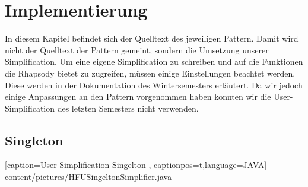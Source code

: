 \chapter{Implementierung}

In diesem Kapitel befindet sich der Quelltext des jeweiligen Pattern. Damit wird
nicht der Quelltext der Pattern gemeint, sondern die Umsetzung unserer
Simplification. Um eine eigene Simplification zu schreiben und auf die
Funktionen die Rhapsody bietet zu zugreifen, müssen einige Einstellungen
beachtet werden. Diese werden in der Dokumentation des Wintersemesters
erläutert. Da wir jedoch einige Anpassungen an den Pattern vorgenommen haben
konnten wir die User-Simplification des letzten Semesters nicht verwenden. 

\section{Singleton}

    [caption={User-Simplification Singelton}
       \label{lst:javaclass},
       captionpos=t,language=JAVA]
 {content/pictures/HFUSingeltonSimplifier.java} 

